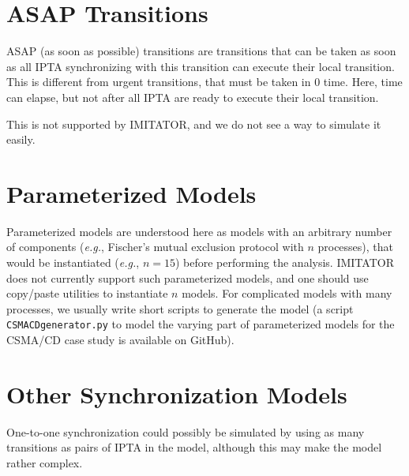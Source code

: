 \documentclass[a4paper,11pt]{report}
\newcommand{\imitator}{\textsf{IMITATOR}}
\newcommand{\IPTA}{IPTA}
\newcommand{\stylePath}[1]{\textcolor{pathcolor}{\texttt{#1}}}
\newcommand{\GitHubIMI}{GitHub} %
\newcommand{\eg}{\textcolor{colorok}{\textit{e.g.}, }}
\begin{document}



\section{ASAP Transitions}

ASAP (as soon as possible) transitions are transitions that can be taken as soon as all \IPTA{} synchronizing with this transition can execute their local transition.
This is different from urgent transitions, that must be taken in 0 time.
Here, time can elapse, but not after all \IPTA{} are ready to execute their local transition.

This is not supported by \imitator{}, and we do not see a way to simulate it easily.



\section{Parameterized Models}

Parameterized models are understood here as models with an arbitrary number of components (\eg{} Fischer's mutual exclusion protocol with $n$ processes), that would be instantiated (\eg{} $n = 15$) before performing the analysis.
\imitator{} does not currently support such parameterized models, and one should use copy/paste utilities to instantiate $n$ models.
For complicated models with many processes, we usually write short scripts to generate the model (a script \stylePath{CSMACDgenerator.py} to model the varying part of parameterized models for the CSMA/CD case study is available on \GitHubIMI{}).




\section{Other Synchronization Models}

One-to-one synchronization could possibly be simulated by using as many transitions as pairs of \IPTA{} in the model, although this may make the model rather complex.
\end{document}
